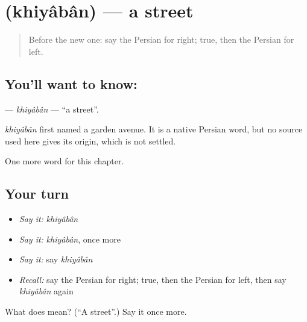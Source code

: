 \section[\texorpdfstring{\fa{خیابان} (khiyâbân)}{خیابان (khiyâbân)}]{ (khiyâbân) — a street}

\label{lesson:FA-C69-khiyaban}



\begin{quote}
Before the new one: say the Persian for right; true, then the Persian for left.
\end{quote}

\subsection*{You'll want to know: }
\textbf{} — \emph{khiyâbân} — \textquotedblleft{}a street\textquotedblright{}.

\begin{cousinweb}
\emph{khiyâbân} first named a garden avenue. It is a native Persian word, but no source used here gives its origin, which is not settled.
\end{cousinweb}

\begin{grammarlens}[title={What you've built}]
One more word for this chapter.
\end{grammarlens}

\subsection*{Your turn}
\begin{itemize}
\raggedright
  \item \emph{Say it:} \emph{khiyâbân}
  \item \emph{Say it:} \emph{khiyâbân}, once more
  \item \emph{Say it:} say \emph{khiyâbân}
  \item \emph{Recall:} say the Persian for right; true, then the Persian for left, then say \emph{khiyâbân} again
\end{itemize}

\begin{tcolorbox}[breakable,colback=teal!4,colframe=teal!35!black,title={Before you move on}]
What does  mean? (\textquotedblleft{}A street\textquotedblright{}.) Say it once more.
\end{tcolorbox}
